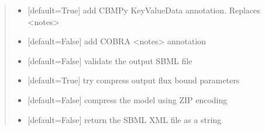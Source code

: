 \documentclass[letterpaper,12pt,english]{sphinxmanual}
\begin{document}
\begin{fulllineitems}
\begin{quote}
\begin{description}
\begin{itemize}
\item {} 
\sphinxAtStartPar
{} \textendash{} {[}default=True{]} add CBMPy KeyValueData annotation. Replaces \textless{}notes\textgreater{}

\item {} 
\sphinxAtStartPar
{} \textendash{} {[}default=False{]} add COBRA \textless{}notes\textgreater{} annotation

\item {} 
\sphinxAtStartPar
{} \textendash{} {[}default=False{]} validate the output SBML file

\item {} 
\sphinxAtStartPar
{} \textendash{} {[}default=True{]} try compress output flux bound parameters

\item {} 
\sphinxAtStartPar
{} \textendash{} {[}default=False{]} compress the model using ZIP encoding

\item {} 
\sphinxAtStartPar
{} \textendash{} {[}default=False{]} return the SBML XML file as a string

\end{itemize}

\end{description}\end{quote}

\end{fulllineitems}
\end{document}
